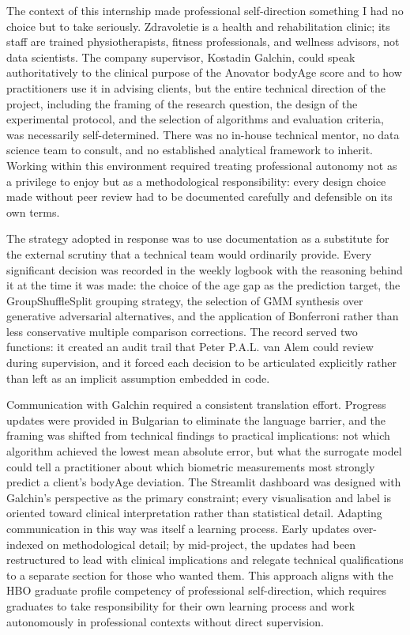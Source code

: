 \documentclass[11pt,a4paper]{report}
\begin{document}
The context of this internship made professional self-direction something I had no choice but to
take seriously. Zdravoletie is a health and rehabilitation clinic; its staff are trained
physiotherapists, fitness professionals, and wellness advisors, not data scientists. The company
supervisor, Kostadin Galchin, could speak authoritatively to the clinical purpose of the Anovator
bodyAge score and to how practitioners use it in advising clients, but the entire technical
direction of the project, including the framing of the research question, the design of the
experimental protocol, and the selection of algorithms and evaluation criteria, was necessarily
self-determined. There was no in-house technical mentor, no data science team to consult, and no
established analytical framework to inherit. Working within this environment required treating
professional autonomy not as a privilege to enjoy but as a methodological responsibility: every
design choice made without peer review had to be documented carefully and defensible on its own
terms.

The strategy adopted in response was to use documentation as a substitute for the external scrutiny
that a technical team would ordinarily provide. Every significant decision was recorded in the
weekly logbook with the reasoning behind it at the time it was made: the choice of the age gap as
the prediction target, the GroupShuffleSplit grouping strategy, the selection of GMM synthesis over
generative adversarial alternatives, and the application of Bonferroni rather than less conservative
multiple comparison corrections. The record served two functions: it created an audit trail that
Peter P.A.L. van Alem could review during supervision, and it forced each decision to be articulated explicitly
rather than left as an implicit assumption embedded in code.

Communication with Galchin required a consistent translation effort. Progress updates were provided
in Bulgarian to eliminate the language barrier, and the framing was shifted from technical findings
to practical implications: not which algorithm achieved the lowest mean absolute error, but what the
surrogate model could tell a practitioner about which biometric measurements most strongly predict a
client's bodyAge deviation. The Streamlit dashboard was designed with Galchin's perspective as the
primary constraint; every visualisation and label is oriented toward clinical interpretation rather
than statistical detail. Adapting communication in this way was itself a learning process. Early
updates over-indexed on methodological detail; by mid-project, the updates had been restructured to
lead with clinical implications and relegate technical qualifications to a separate section for
those who wanted them. This approach aligns with the HBO graduate profile competency of
professional self-direction, which requires graduates to take responsibility for their own learning
process and work autonomously in professional contexts without direct supervision.
\end{document}
